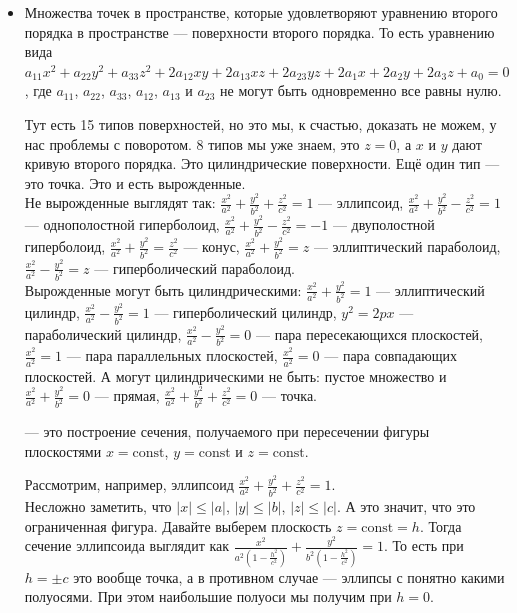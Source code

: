 \documentclass{article}
\begin{document}
    \begin{itemize}
        \item[]
        Множества точек в пространстве, которые удовлетворяют уравнению второго порядка в пространстве --- поверхности второго порядка. То есть уравнению вида $a_{11}x^2+a_{22}y^2+a_{33}z^2+2a_{12}xy+2a_{13}xz+2a_{23}yz+2a_1x+2a_2y+2a_3z+a_0=0$, где $a_{11}$, $a_{22}$, $a_{33}$, $a_{12}$, $a_{13}$ и $a_{23}$ не могут быть одновременно все равны нулю.
        \begin{Comment}
            Тут есть 15 типов поверхностей, но это мы, к счастью, доказать не можем, у нас проблемы с поворотом. 8 типов мы уже знаем, это $z=0$, а $x$ и $y$ дают кривую второго порядка. Это цилиндрические поверхности. Ещё один тип --- это точка. Это и есть вырожденные.\\
            Не вырожденные выглядят так:
            $\frac{x^2}{a^2}+\frac{y^2}{b^2}+\frac{z^2}{c^2}=1$ --- эллипсоид, $\frac{x^2}{a^2}+\frac{y^2}{b^2}-\frac{z^2}{c^2}=1$ --- однополостной гиперболоид, $\frac{x^2}{a^2}+\frac{y^2}{b^2}-\frac{z^2}{c^2}=-1$ --- двуполостной гиперболоид, $\frac{x^2}{a^2}+\frac{y^2}{b^2}=\frac{z^2}{c^2}$ --- конус, $\frac{x^2}{a^2}+\frac{y^2}{b^2}=z$ --- эллиптический параболоид, $\frac{x^2}{a^2}-\frac{y^2}{b^2}=z$ --- гиперболический параболоид.\\
            Вырожденные могут быть цилиндрическими: $\frac{x^2}{a^2}+\frac{y^2}{b^2}=1$ --- эллиптический цилиндр, $\frac{x^2}{a^2}-\frac{y^2}{b^2}=1$ --- гиперболический цилиндр, $y^2=2px$ --- параболический цилиндр, $\frac{x^2}{a^2}-\frac{y^2}{b^2}=0$ --- пара пересекающихся плоскостей, $\frac{x^2}{a^2}=1$ --- пара параллельных плоскостей, $\frac{x^2}{a^2}=0$ --- пара совпадающих плоскостей.
            А могут цилиндрическими не быть: пустое множество и $\frac{x^2}{a^2}+\frac{y^2}{b^2}=0$ --- прямая, $\frac{x^2}{a^2}+\frac{y^2}{b^2}+\frac{z^2}{c^2}=0$ --- точка.
        \end{Comment}
        \dfn {} --- это построение сечения, получаемого при пересечении фигуры плоскостями $x=\mathrm{const}$, $y=\mathrm{const}$ и $z=\mathrm{const}$.
        \begin{Example}
            Рассмотрим, например, эллипсоид $\frac{x^2}{a^2}+\frac{y^2}{b^2}+\frac{z^2}{c^2}=1$.\\
            Несложно заметить, что $|x|\leqslant|a|$, $|y|\leqslant|b|$, $|z|\leqslant|c|$. А это значит, что это ограниченная фигура. Давайте выберем плоскость $z=\mathrm{const}=h$. Тогда сечение эллипсоида выглядит как $\frac{x^2}{a^2\left(1-\frac{h^2}{c^2}\right)}+\frac{y^2}{b^2\left(1-\frac{h^2}{c^2}\right)}=1$. То есть при $h=\pm c$ это вообще точка, а в противном случае --- эллипсы с понятно какими полуосями. При этом наибольшие полуоси мы получим при $h=0$.

\end{Example}
\end{itemize}
\end{document}
